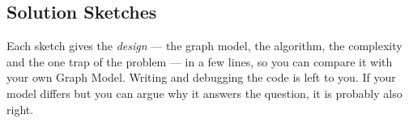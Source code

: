 \subsection{Solution Sketches}
\label{ssec:ch1-sketches}

\begin{warningbox}
Each sketch gives the \emph{design} --- the graph model, the algorithm, the complexity and the one trap of the problem --- in a few lines, so you can compare it with your own Graph Model. Writing and debugging the code is left to you. If your model differs but you can argue why it answers the question, it is probably also right.
\end{warningbox}

\begingroup
\providecommand{\sk}{}
\renewcommand{\sk}[2]{\par\smallskip\noindent\textbf{\textcolor{deepblue}{#1}}\quad #2\par}

